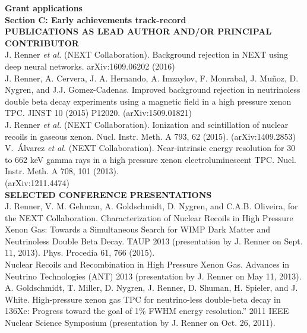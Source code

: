 \documentclass[11pt,a4paper]{article}
\begin{document}
\noindent\textbf{Grant applications}\\

\newpage
{\textbf{Section C: Early achievements track-record}}\\

\noindent \textbf{PUBLICATIONS AS LEAD AUTHOR AND/OR PRINCIPAL CONTRIBUTOR}\\

\noindent J. Renner \emph{et al.} (NEXT Collaboration).  Background rejection in NEXT using deep neural networks.  arXiv:1609.06202 (2016)\\

\noindent J. Renner, A. Cervera, J. A. Hernando, A. Imzaylov, F. Monrabal, J. Mu\~noz, D. Nygren, and J.J. Gomez-Cadenas.  Improved background rejection in neutrinoless double beta decay experiments using a magnetic field in a high pressure xenon TPC.  JINST 10 (2015) P12020. (arXiv:1509.01821)\\

\noindent J. Renner \emph{et al.} (NEXT Collaboration).  Ionization and scintillation of nuclear recoils in gaseous xenon.  Nucl. Instr. Meth. A 793, 62 (2015).  (arXiv:1409.2853)\\

\noindent V.\ \'{A}lvarez \emph{et al.} (NEXT Collaboration). Near-intrinsic energy resolution for 30 to 662 keV gamma rays in a high pressure xenon electroluminescent TPC. Nucl. Instr. Meth. A 708, 
101 (2013).\\(arXiv:1211.4474)\\

\noindent \textbf{SELECTED CONFERENCE PRESENTATIONS}\\

\noindent J. Renner, V. M. Gehman, A. Goldschmidt, D. Nygren, and C.A.B. Oliveira, for the NEXT Collaboration. 
Characterization of Nuclear Recoils in High Pressure Xenon Gas: Towards a Simultaneous Search for WIMP Dark Matter and Neutrinoless 
Double Beta Decay.  TAUP 2013 (presentation by J. Renner on Sept. 11, 2013). Phys. Procedia 61, 766 (2015).\\

\noindent Nuclear Recoils and Recombination in High Pressure Xenon Gas.  Advances in Neutrino Technologies (ANT) 2013 
(presentation by J. Renner on May 11, 2013).\\

\noindent A. Goldschmidt, T. Miller, D. Nygren, J. Renner, D. Shuman, H. Spieler, and J. White.
High-pressure xenon gas TPC for neutrino-less double-beta decay in 136Xe: Progress toward the goal of 1\% FWHM energy resolution.” 
2011 IEEE Nuclear Science Symposium (presentation by J. Renner on Oct. 26, 2011).\\
\end{document}
